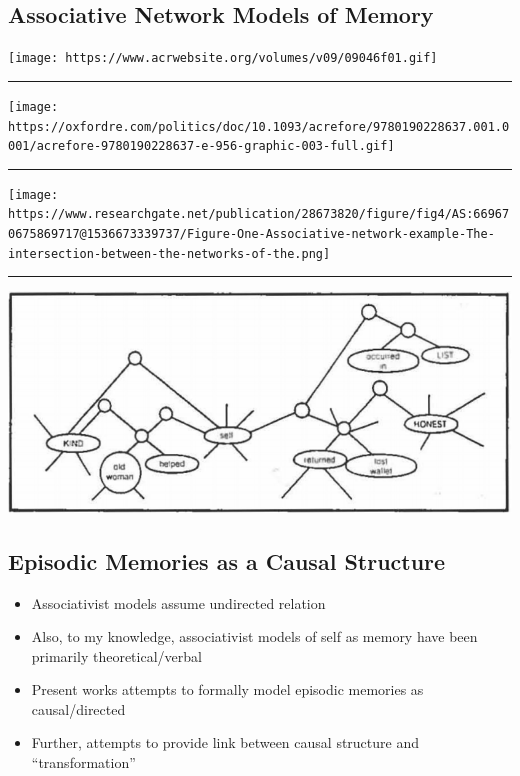 \documentclass[
  .7em,
  letterpaper,
  DIV=11,
  numbers=noendperiod]{scrartcl}
\begin{document}
\hypertarget{associative-network-models-of-memory}{%
\subsection{Associative Network Models of
Memory}\label{associative-network-models-of-memory}}

\texttt{[image: https://www.acrwebsite.org/volumes/v09/09046f01.gif]}

\begin{center}\rule{0.5\linewidth}{0.5pt}\end{center}

\texttt{[image: https://oxfordre.com/politics/doc/10.1093/acrefore/9780190228637.001.0001/acrefore-9780190228637-e-956-graphic-003-full.gif]}

\begin{center}\rule{0.5\linewidth}{0.5pt}\end{center}

\texttt{[image: https://www.researchgate.net/publication/28673820/figure/fig4/AS:669670675869717@1536673339737/Figure-One-Associative-network-example-The-intersection-between-the-networks-of-the.png]}

\begin{center}\rule{0.5\linewidth}{0.5pt}\end{center}

\includegraphics{images/Picture1.png}

\hypertarget{episodic-memories-as-a-causal-structure}{%
\subsection{Episodic Memories as a Causal
Structure}\label{episodic-memories-as-a-causal-structure}}

\begin{itemize}
\item
  Associativist models assume undirected relation
\item
  Also, to my knowledge, associativist models of self as memory have
  been primarily theoretical/verbal
\item
  Present works attempts to formally model episodic memories as
  causal/directed
\item
  Further, attempts to provide link between causal structure and
  ``transformation''
\end{itemize}
\end{document}
